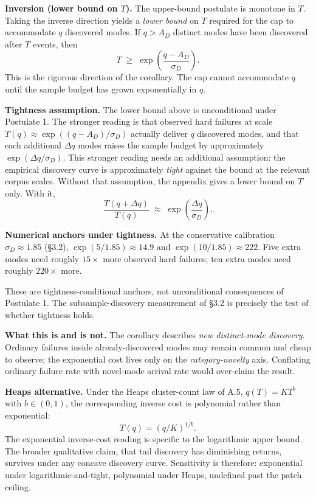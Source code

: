 \documentclass[
]{article}
\begin{document}
\textbf{Inversion (lower bound on \(T\)).} The upper-bound postulate is
monotone in \(T\). Taking the inverse direction yields a \emph{lower
bound} on \(T\) required for the cap to accommodate \(q\) discovered
modes. If \(q > A_D\) distinct modes have been discovered after \(T\)
events, then \[
T \;\geq\; \exp\!\left(\frac{q - A_D}{\sigma_D}\right).
\] This is the rigorous direction of the corollary. The cap cannot
accommodate \(q\) until the sample budget has grown exponentially in
\(q\).

\textbf{Tightness assumption.} The lower bound above is unconditional
under Postulate 1. The stronger reading is that observed hard failures
at scale \(T(q) \approx \exp((q - A_D)/\sigma_D)\) actually deliver
\(q\) discovered modes, and that each additional \(\Delta q\) modes
raises the sample budget by approximately \(\exp(\Delta q/\sigma_D)\).
This stronger reading needs an additional assumption: the empirical
discovery curve is approximately \emph{tight} against the bound at the
relevant corpus scales. Without that assumption, the appendix gives a
lower bound on \(T\) only. With it, \[
\frac{T(q + \Delta q)}{T(q)} \;\approx\; \exp\!\left(\frac{\Delta q}{\sigma_D}\right).
\]

\textbf{Numerical anchors under tightness.} At the conservative
calibration \(\sigma_D \approx 1.85\) (§3.2),
\(\exp(5/1.85) \approx 14.9\) and \(\exp(10/1.85) \approx 222\). Five
extra modes need roughly \(15\times\) more observed hard failures; ten
extra modes need roughly \(220\times\) more.

These are tightness-conditional anchors, not unconditional consequences
of Postulate 1. The subsample-discovery measurement of §3.2 is precisely
the test of whether tightness holds.

\textbf{What this is and is not.} The corollary describes \emph{new
distinct-mode discovery}. Ordinary failures inside already-discovered
modes may remain common and cheap to observe; the exponential cost lives
only on the \emph{category-novelty} axis. Conflating ordinary failure
rate with novel-mode arrival rate would over-claim the result.

\textbf{Heaps alternative.} Under the Heaps cluster-count law of A.5,
\(q(T) = K T^b\) with \(b \in (0,1)\), the corresponding inverse cost is
polynomial rather than exponential: \[
T(q) = (q / K)^{1/b}.
\] The exponential inverse-cost reading is specific to the logarithmic
upper bound. The broader qualitative claim, that tail discovery has
diminishing returns, survives under any concave discovery curve.
Sensitivity is therefore: exponential under logarithmic-and-tight,
polynomial under Heaps, undefined past the patch ceiling.
\end{document}
